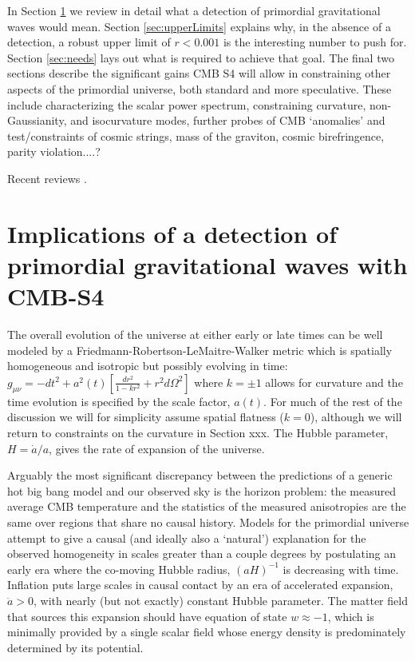 In Section \ref{sec:detection} we review in detail what a detection of primordial gravitational waves would mean. Section \ref{sec:upperLimits} explains why, in the absence of a detection, a robust upper limit of $r<0.001$ is the interesting number to push for. Section \ref{sec:needs} lays out what is required to achieve that goal. The final two sections describe the significant gains CMB S4 will allow in constraining other aspects of the primordial universe, both standard and more speculative. These include characterizing the scalar power spectrum, constraining curvature, non-Gaussianity, and isocurvature modes, further probes of CMB `anomalies' and test/constraints of cosmic strings, mass of the graviton, cosmic birefringence, parity violation....?
 
Recent reviews \cite{Kamionkowski:2015yta}.

\section{Implications of a detection of primordial gravitational waves with CMB-S4}
\label{sec:detection}
The overall evolution of the universe at either early or late times can be well modeled by a Friedmann-Robertson-LeMaitre-Walker metric which is spatially homogeneous and isotropic but possibly evolving in time: $g_{\mu\nu}=-dt^2+a^2(t)[\frac{dr^2}{1-kr^2}+r^2d\Omega^2]$ where $k=\pm1$ allows for curvature and the time evolution is specified by the scale factor, $a(t)$. For much of the rest of the discussion we will for simplicity assume spatial flatness ($k=0$), although we will return to constraints on the curvature in Section xxx. The Hubble parameter, $H=\dot{a}/a$, gives the rate of expansion of the universe. 

Arguably the most significant discrepancy between the predictions of a generic hot big bang model and our observed sky is the horizon problem: the measured average CMB temperature and the statistics of the measured anisotropies are the same over regions that share no causal history. Models for the primordial universe attempt to give a causal (and ideally also a `natural') explanation for the observed homogeneity in scales greater than a couple degrees by postulating an early era where the co-moving Hubble radius, $(aH)^{-1}$ is decreasing with time. Inflation puts large scales in causal contact by an era of accelerated expansion, $\ddot{a}>0$, with nearly (but not exactly) constant Hubble parameter. The matter field that sources this expansion should have equation of state $w\approx -1$, which is minimally provided by a single scalar field whose energy density is predominately determined by its potential.

